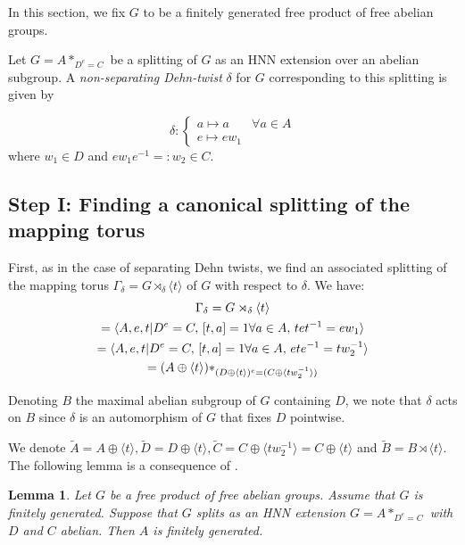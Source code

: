 \documentclass{amsart}
\theoremstyle{plain}
\newtheorem{lemma}[thm]{Lemma}
\theoremstyle{definition}
\theoremstyle{remark}
\begin{document}
In this section, we fix $G$ to be a finitely generated free product of free abelian groups.

Let $G=A*_{D^{e}=C}$ be a splitting of $G$ as an HNN extension over an abelian subgroup. A \textit{non-separating Dehn-twist} $\delta$ for $G$ corresponding to this splitting is given by

$$ \delta : \begin{cases}
    a \mapsto a & \forall a \in A \\
    e \mapsto ew_{1} 
\end{cases} $$
where $w_{1}\in D$ and $ew_{1}e^{-1}=:w_{2}\in C$.


\subsection{Step I: Finding a canonical splitting of the mapping torus}
First, as in the case of separating Dehn twists, we find an associated splitting of the mapping torus $\Gamma_{\delta} = G \rtimes_{\delta} \langle t \rangle$ of $G$ with respect to $\delta$. 
We have: 
\begin{gather*}
    \Gamma_{\delta}
    = G\rtimes_{\delta} \langle t \rangle  \\
    = \langle A,e,t \vert  D^{e}=C, \, [t,a]=1 \space \forall a\in A,\, tet^{-1}=ew_{1} \rangle \\
    = \langle A , e, t \vert  D^{e}=C,\, [t,a]=1 \space\forall a\in A, \, ete^{-1}=tw_{2}^{-1} \rangle \\
    = (A\oplus \langle t\rangle) *_{(D\oplus \langle t \rangle)^{e} = (C\oplus \langle tw_{2}^{-1} \rangle)}
\end{gather*}


Denoting $B$ the maximal abelian subgroup of $G$ containing $D$, we note that $\delta$ acts on $B$ since $\delta$ is an automorphism of $G$ that fixes $D$ pointwise. 

We denote $\tilde{A} = A \oplus \langle t \rangle, \tilde{D} = D \oplus \langle t \rangle, \tilde{C} = C \oplus \langle tw_2^{-1} \rangle = C \oplus \langle t \rangle$ and $\tilde{B} = B \rtimes \langle t \rangle$. The following lemma is a consequence of \cite[Theorem 1.3]{Finiteness_properties_graphs_of_groups}.

\begin{lemma}
    \label{lemma: A is finitely generated}
    Let $G$ be a free product of free abelian groups. Assume that $G$ is finitely generated. Suppose that $G$ splits as an HNN extension $G = A*_{D^e = C}$ with $D$ and $C$ abelian. Then $A$ is finitely generated.
\end{lemma}
\end{document}
